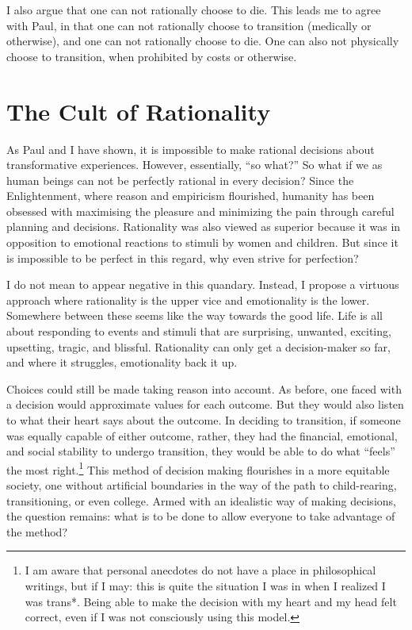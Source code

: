 \documentclass[12pt]{article}
\begin{document}
I also argue that one can not rationally choose to die. This leads me to agree with Paul, in that
one can not rationally choose to transition (medically or otherwise), and one can not rationally
choose to die. One can also not physically choose to transition, when prohibited by costs or
otherwise. 

\section{The Cult of Rationality}

As Paul and I have shown, it is impossible to make rational decisions about transformative
experiences. However, essentially, ``so what?'' So what if we as human beings can not be perfectly
rational in every decision? Since the Enlightenment, where reason and empiricism flourished,
humanity has been obsessed with maximising the pleasure and minimizing the pain through careful
planning and decisions. Rationality was also viewed as superior because it was in opposition to
emotional reactions to stimuli by women and children. But since it is impossible to be perfect in
this regard, why even strive for perfection?

I do not mean to appear negative in this quandary. Instead, I propose a virtuous approach where
rationality is the upper vice and emotionality is the lower. Somewhere between these seems like the
way towards the good life. Life is all about responding to events and stimuli that are surprising,
unwanted, exciting, upsetting, tragic, and blissful. Rationality can only get a decision-maker so
far, and where it struggles, emotionality back it up. 

Choices could still be made taking reason into account. As before, one faced with a decision would
approximate values for each outcome. But they would also listen to what their heart says about the
outcome. In deciding to transition, if someone was equally capable of either outcome, rather, they
had the financial, emotional, and social stability to undergo transition, they would be able to do
what ``feels'' the most right.\footnote{I am aware that personal anecdotes do not have a place in
philosophical writings, but if I may: this is quite the situation I was in when I realized I was
trans*. Being able to make the decision with my heart and my head felt correct, even if I was not
consciously using this model.} This method of decision making flourishes in a more equitable
society, one without artificial boundaries in the way of the path to child-rearing, transitioning,
or even college. Armed with an idealistic way of making decisions, the question remains: what is to
be done to allow everyone to take advantage of the method?

\printbibliography
\end{document}
